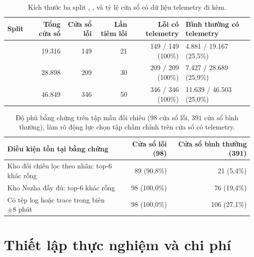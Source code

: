 \begin{table}[htbp]
  \centering
  \caption[Kích thước các split và tỷ lệ cửa sổ có telemetry trên Nezha]{Kích thước ba split , ,  và tỷ lệ cửa sổ có dữ liệu telemetry đi kèm.}
  \label{tab:ch5-splits}
  \scriptsize
  \renewcommand{\arraystretch}{1.15}
  \begin{tabularx}{\linewidth}{@{}l r r r r Y@{}}
    \toprule
    \textbf{Split} & \textbf{Tổng cửa sổ} & \textbf{Cửa sổ lỗi} & \textbf{Lần tiêm lỗi} & \textbf{Lỗi có telemetry} & \textbf{Bình thường có telemetry} \\
    \midrule
     & 19.316 & 149 & 21 & 149 / 149 (100\%) & 4.881 / 19.167 (25,5\%) \\
     & 28.898 & 209 & 30 & 209 / 209 (100\%) & 7.427 / 28.689 (25,9\%) \\
     & 46.849 & 346 & 50 & 346 / 346 (100\%) & 11.639 / 46.503 (25,0\%) \\
    \bottomrule
  \end{tabularx}
\end{table}

\begin{table}[htbp]
  \centering
  \caption[Độ phủ bằng chứng giữa cửa sổ lỗi và cửa sổ bình thường]{Độ phủ bằng chứng trên tập mẫu đối chiếu ($98$ cửa sổ lỗi, $391$ cửa sổ bình thường), làm rõ động lực chọn tập chấm chính trên cửa sổ có telemetry.}
  \label{tab:ch5-coverage}
  \scriptsize
  \renewcommand{\arraystretch}{1.15}
  \begin{tabularx}{\linewidth}{@{}Y r r@{}}
    \toprule
    \textbf{Điều kiện tồn tại bằng chứng} & \textbf{Cửa sổ lỗi (98)} & \textbf{Cửa sổ bình thường (391)} \\
    \midrule
    Kho đối chiếu lọc theo nhãn: top-6 khác rỗng & 89 (90,8\%) & 21 (5,4\%) \\
    Kho Nezha đầy đủ: top-6 khác rỗng & 98 (100,0\%) & 76 (19,4\%) \\
    Có tệp log hoặc trace trong biên $\pm 8$ phút & 98 (100,0\%) & 106 (27,1\%) \\
    \bottomrule
  \end{tabularx}
\end{table}

\section{Thiết lập thực nghiệm và chi phí}
\label{sec:ch5-setup}

